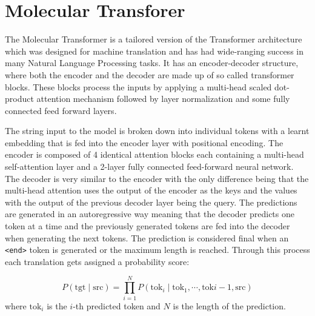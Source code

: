 \section{Molecular Transforer}
The Molecular Transformer \cite{Schwaller2019MolecularPrediction} is a tailored version of the Transformer architecture \cite{Vaswani2017} which was designed for machine translation and has had wide-ranging success in many Natural Language Processing tasks. It has an encoder-decoder structure, where both the encoder and the decoder are made up of so called transformer blocks. These blocks process the inputs by applying a multi-head scaled dot-product attention mechanism followed by layer normalization and some fully connected feed forward layers.

The string input to the model is broken down into individual tokens with a learnt embedding that is fed into the encoder layer with positional encoding. The encoder is composed of 4 identical attention blocks each containing a multi-head self-attention layer and a 2-layer fully connected feed-forward neural network. The decoder is very similar to the encoder with the only difference being that the multi-head attention uses the output of the encoder as the keys and the values with the output of the previous decoder layer being the query. The predictions are generated in an autoregressive way meaning that the decoder predicts one token at a time and the previously generated tokens are fed into the decoder when generating the next tokens. The prediction is considered final when an \texttt{<end>} token is generated or the maximum length is reached. Through this process each translation gets assigned a probability score:

\begin{equation}
    P(\textrm{tgt} \mid \textrm{src}) = \prod_{i=1}^N P(\textrm{tok}_i \mid \textrm{tok}_1, \cdots , \textrm{tok}{i-1}, \textrm{src}) 
\end{equation}
where $\textrm{tok}_i$ is the $i$-th predicted token and $N$ is the length of the prediction.



